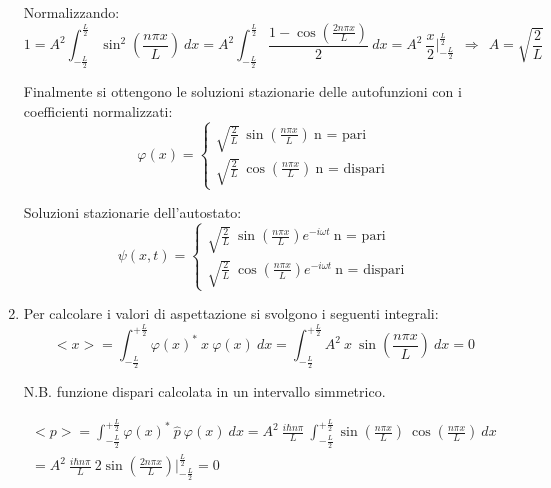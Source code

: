 \documentclass[12pt,twoside,a4]{article}
\begin{document}
\begin{solution}
\begin{enumerate}[label=(\textit{\roman*})]
Normalizzando: \begin{equation*}
 1 = A^2 \int_{-\frac{L}{2}}^{\frac{L}{2}} {\sin^2{\left( \frac{n \pi x}{L} \right)}} \ dx =  A^2 \int_{-\frac{L}{2}}^{\frac{L}{2}} { \frac{1- \cos{\left( \frac{ 2 n \pi x}{L} \right)}}{2}} \ dx = A^2 \ \frac{x}{2} \Big|_{-\frac{L}{2}}^{\frac{L}{2}} \ \  \Rightarrow \ \  A = \sqrt{\frac{2}{L}}  
\end{equation*}

Finalmente si ottengono le soluzioni stazionarie delle autofunzioni con i coefficienti normalizzati: \begin{equation*}
\varphi(x) = \begin{cases}
    \sqrt{\frac{2}{L}} \ \sin{(\frac{n \pi x }{L})}  \  \text{n = pari} \\
    \sqrt{\frac{2}{L}} \ \cos{(\frac{n \pi x }{L})}  \  \text{n = dispari}
\end{cases} 
\end{equation*}

Soluzioni stazionarie dell'autostato: \begin{equation*}
    \psi(x, t) = \begin{cases}
    \sqrt{\frac{2}{L}} \ \sin{(\frac{n \pi x }{L})} e^{-i\omega t}  \  \text{n = pari} \\
    \sqrt{\frac{2}{L}} \ \cos{(\frac{n \pi x }{L})} e^{-i\omega t}  \  \text{n = dispari}
\end{cases} 
\end{equation*}

\item  Per calcolare i valori di aspettazione si svolgono i seguenti integrali: \begin{equation*}
    < x >  = \int_{-\frac{L}{2}}^{+\frac{L}{2}} {\varphi(x)^\ast \ x \ \varphi(x)} \ dx = \int_{-\frac{L}{2}}^{+\frac{L}{2}} {A^2 \ x \ \sin{\left( \frac{n \pi x}{L}\right )} } \ dx = 0        
\end{equation*}

N.B. funzione dispari calcolata in un intervallo simmetrico.


\begin{gather} 
    < p > = \int_{-\frac{L}{2}}^{+\frac{L}{2}} {\varphi(x)^\ast \ \hat{p} \ \varphi(x)} \ dx = A^2 \ \frac{i \hbar n \pi}{L} \ \int_{-\frac{L}{2}}^{+\frac{L}{2}} {\sin{\left( \frac{n \pi x}{L}\right )} \ \cos{\left( \frac{n \pi x}{L}\right )}} \ dx \\=A^2 \ \frac{i \hbar n \pi}{L} \ 2 \sin{\left( \frac{2 n \pi x}{L}\right )} \Big|_{-\frac{L}{2}}^{\frac{L}{2}} =  0       
\end{gather}


\end{enumerate}
\end{solution}
\end{document}
